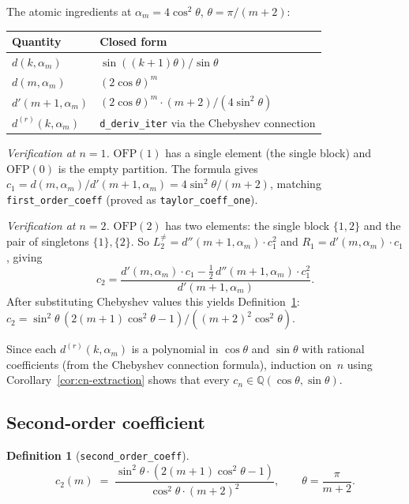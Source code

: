 \documentclass[11pt,a4paper]{article}
\theoremstyle{plain}
\theoremstyle{definition}
\newtheorem{definition}[theorem]{Definition}
\newcommand{\alpham}{\alpha_m}
\newcommand{\lean}[1]{\texttt{#1}}
\begin{document}
The atomic ingredients at $\alpham = 4\cos^2\theta$,
$\theta = \pi/(m{+}2)$:

\medskip
\begin{center}
\begin{tabular}{@{}ll@{}}
\toprule
Quantity & Closed form \\
\midrule
$d(k,\alpham)$ & $\sin((k{+}1)\theta)/\sin\theta$ \\
$d(m,\alpham)$ & $(2\cos\theta)^m$ \\
$d'(m{+}1,\alpham)$ & $(2\cos\theta)^m \cdot (m{+}2)/(4\sin^2\theta)$ \\
$d^{(r)}(k,\alpham)$ & \lean{d\_deriv\_iter} via the Chebyshev connection \\
\bottomrule
\end{tabular}
\end{center}
\medskip

\noindent\emph{Verification at $n = 1$.}
$\mathrm{OFP}(1)$ has a single element (the single block)
and $\mathrm{OFP}(0)$ is the empty partition.
The formula gives
$c_1 = d(m,\alpham)/d'(m{+}1,\alpham)
     = 4\sin^2\theta/(m{+}2)$,
matching \lean{first\_order\_coeff}
(proved as \lean{taylor\_coeff\_one}).

\smallskip
\noindent\emph{Verification at $n = 2$.}
$\mathrm{OFP}(2)$ has two elements: the single block $\{1,2\}$ and
the pair of singletons $\{1\},\{2\}$.
So $L_2^{\ne} = d''(m{+}1,\alpham) \cdot c_1^2$ and
$R_1 = d'(m,\alpham) \cdot c_1$, giving
\[
  c_2 = \frac{d'(m,\alpham)\cdot c_1 - \tfrac{1}{2}\,d''(m{+}1,\alpham)\cdot c_1^2}
             {d'(m{+}1,\alpham)}.
\]
After substituting Chebyshev values this yields
Definition~\ref{def:c2}:
$c_2 = \sin^2\theta\,(2(m{+}1)\cos^2\theta - 1) / ((m{+}2)^2 \cos^2\theta)$.

\smallskip
Since each $d^{(r)}(k, \alpham)$ is a polynomial in $\cos\theta$
and $\sin\theta$ with rational coefficients (from the Chebyshev
connection formula), induction on~$n$ using
Corollary~\ref{cor:cn-extraction} shows that every
$c_n \in \mathbb{Q}(\cos\theta, \sin\theta)$.

\subsection{Second-order coefficient}

\begin{definition}[\lean{second\_order\_coeff}]
\label{def:c2}
\[
  c_2(m) \;=\;
  \frac{\sin^2\theta \cdot (2(m{+}1)\cos^2\theta - 1)}
       {\cos^2\theta \cdot (m{+}2)^2},
  \qquad \theta = \frac{\pi}{m+2}.
\]
\end{definition}
\end{document}
